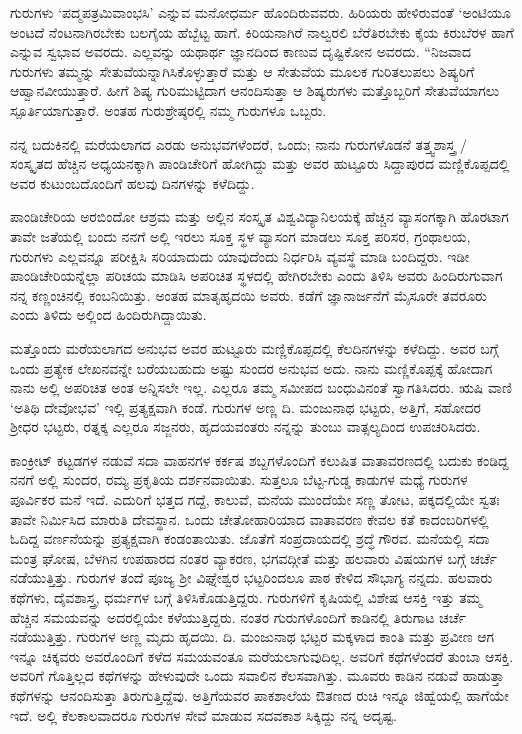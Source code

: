 ಗುರುಗಳು ‘ಪದ್ಮಪತ್ರಮಿವಾಂಭಸಿ’ ಎನ್ನುವ ಮನೋಧರ್ಮ ಹೊಂದಿರುವವರು. ಹಿರಿಯರು ಹೇಳಿರುವಂತೆ ‘ಅಂಟಿಯೂ ಅಂಟದೆ ನೆಂಟನಾಗಿರಬೇಕು ಬಲಗೈಯ ಹೆಬ್ಬೆಟ್ಟ ಹಾಗೆ. ಕಿರಿಯನಾಗಿರೆ ನಾಲ್ವರಲಿ ಬೆರೆತಿರಬೇಕು ಕೈಯ ಕಿರುಬೆರಳ ಹಾಗೆ ಎನ್ನುವ ಸ್ವಭಾವ ಅವರದು. ಎಲ್ಲವನ್ನು ಯಥಾರ್ಥ ಜ್ಞಾನದಿಂದ ಕಾಣುವ ದೃಷ್ಟಿಕೋನ ಅವರದು. “ನಿಜವಾದ ಗುರುಗಳು ತಮ್ಮನ್ನು ಸೇತುವೆಯನ್ನಾಗಿಸಿಕೊಳ್ಳುತ್ತಾರೆ ಮತ್ತು ಆ ಸೇತುವೆಯ ಮೂಲಕ ಗುರಿತಲುಪಲು ಶಿಷ್ಯರಿಗೆ ಆಹ್ವಾನವೀಯುತ್ತಾರೆ. ಹೀಗೆ ಶಿಷ್ಯ ಗುರಿಮುಟ್ಟಿದಾಗ ಆನಂದಿಸುತ್ತಾ ಆ ಶಿಷ್ಯರುಗಳು ಮತ್ತೊಬ್ಬರಿಗೆ ಸೇತುವೆಯಾಗಲು ಸ್ಪೂರ್ತಿಯಾಗುತ್ತಾರೆ. ಅಂತಹ ಗುರುಶ್ರೇಷ್ಠರಲ್ಲಿ ನಮ್ಮ ಗುರುಗಳೂ ಒಬ್ಬರು.

ನನ್ನ ಬದುಕಿನಲ್ಲಿ ಮರೆಯಲಾಗದ ಎರಡು ಅನುಭವಗಳೆಂದರೆ, ಒಂದು; ನಾನು ಗುರುಗಳೊಡನೆ ತತ್ತ್ವಶಾಸ್ತ್ರ / ಸಂಸ್ಕೃತದ ಹೆಚ್ಚಿನ ಅಧ್ಯಯನಕ್ಕಾಗಿ ಪಾಂಡಿಚೇರಿಗೆ ಹೋಗಿದ್ದು ಮತ್ತು ಅವರ ಹುಟ್ಟೂರು ಸಿದ್ದಾಪುರದ ಮಣ್ಣಿಕೊಪ್ಪದಲ್ಲಿ ಅವರ ಕುಟುಂಬದೊಂದಿಗೆ ಹಲವು ದಿನಗಳನ್ನು ಕಳೆದಿದ್ದು.

ಪಾಂಡಿಚೇರಿಯ ಅರಬಿಂದೋ ಆಶ್ರಮ ಮತ್ತು ಅಲ್ಲಿನ ಸಂಸ್ಕೃತ ವಿಶ್ವವಿದ್ಯಾನಿಲಯಕ್ಕೆ ಹೆಚ್ಚಿನ ವ್ಯಾಸಂಗಕ್ಕಾಗಿ ಹೊರಟಾಗ ತಾವೇ ಜತೆಯಲ್ಲಿ ಬಂದು ನನಗೆ ಅಲ್ಲಿ ಇರಲು ಸೂಕ್ತ ಸ್ಥಳ ವ್ಯಾಸಂಗ ಮಾಡಲು ಸೂಕ್ತ ಪರಿಸರ, ಗ್ರಂಥಾಲಯ, ಗುರುಗಳು ಎಲ್ಲವನ್ನೂ ಪರೀಕ್ಷಿಸಿ ಸರಿಯಾದುದು ಯಾವುದೆಂದು ನಿರ್ಧರಿಸಿ ವ್ಯವಸ್ಥೆ ಮಾಡಿ ಬಂದಿದ್ದರು. ಇಡೀ ಪಾಂಡಿಚೇರಿಯನ್ನೆಲ್ಲಾ ಪರಿಚಯ ಮಾಡಿಸಿ ಅಪರಿಚಿತ ಸ್ಥಳದಲ್ಲಿ ಹೇಗಿರಬೇಕು ಎಂದು ತಿಳಿಸಿ ಅವರು ಹಿಂದಿರುಗುವಾಗ ನನ್ನ ಕಣ್ಣಂಚಿನಲ್ಲಿ ಕಂಬನಿಯಿತ್ತು. ಅಂತಹ ಮಾತೃಹೃದಯಿ ಅವರು. ಕಡೆಗೆ ಜ್ಞಾನಾರ್ಜನೆಗೆ ಮೈಸೂರೇ ತವರೂರು ಎಂದು ತಿಳಿದು ಅಲ್ಲಿಂದ ಹಿಂದಿರುಗಿದ್ದಾಯಿತು.

ಮತ್ತೊಂದು ಮರೆಯಲಾಗದ ಅನುಭವ ಅವರ ಹುಟ್ಟೂರು ಮಣ್ಣಿಕೊಪ್ಪದಲ್ಲಿ ಕೆಲದಿನಗಳನ್ನು ಕಳೆದಿದ್ದು. ಅವರ ಬಗ್ಗೆ ಒಂದು ಪ್ರತ್ಯೇಕ ಲೇಖನವನ್ನೇ ಬರೆಯಬಹುದು ಅಷ್ಟು ಸುಂದರ ಅನುಭವ ಅದು. ನಾನು ಮಣ್ಣಿಕೊಪ್ಪಕ್ಕೆ ಹೋದಾಗ ನಾನು ಅಲ್ಲಿ ಅಪರಿಚಿತ ಅಂತ ಅನ್ನಿಸಲೇ ಇಲ್ಲ. ಎಲ್ಲರೂ ತಮ್ಮ ಸಮೀಪದ ಬಂಧುವಿನಂತೆ ಸ್ವಾಗತಿಸಿದರು. ಋಷಿ ವಾಣಿ ‘ಅತಿಥಿ ದೇವೋಭವ’ ಇಲ್ಲಿ ಪ್ರತ್ಯಕ್ಷವಾಗಿ ಕಂಡೆ. ಗುರುಗಳ ಅಣ್ಣ ದಿ. ಮಂಜುನಾಥ ಭಟ್ಟರು, ಅತ್ತಿಗೆ, ಸಹೋದರ ಶ್ರೀಧರ ಭಟ್ಟರು, ರತ್ನಕ್ಕ ಎಲ್ಲರೂ ಸಜ್ಜನರು, ಹೃದಯವಂತರು ನನ್ನನ್ನು ತುಂಬು ವಾತ್ಸಲ್ಯದಿಂದ ಉಪಚರಿಸಿದರು.

ಕಾಂಕ್ರೀಟ್ ಕಟ್ಟಡಗಳ ನಡುವೆ ಸದಾ ವಾಹನಗಳ ಕರ್ಕಷ ಶಬ್ದಗಳೊಂದಿಗೆ ಕಲುಷಿತ ವಾತಾವರಣದಲ್ಲಿ ಬದುಕು ಕಂಡಿದ್ದ ನನಗೆ ಅಲ್ಲಿ ಸುಂದರ, ರಮ್ಯ ಪ್ರಕೃತಿಯ ದರ್ಶನವಾಯಿತು. ಸುತ್ತಲೂ ಬೆಟ್ಟ-ಗುಡ್ಡ ಕಾಡುಗಳ ಮಧ್ಯೆ ಗುರುಗಳ ಪೂರ್ವಿಕರ ಮನೆ ಇದೆ. ಎದುರಿಗೆ ಭತ್ತದ ಗದ್ದೆ, ಕಾಲುವೆ, ಮನೆಯ ಮುಂದೆಯೇ ಸಣ್ಣ ತೋಟ, ಪಕ್ಕದಲ್ಲಿಯೇ ಸ್ವತಃ ತಾವೇ ನಿರ್ಮಿಸಿದ ಮಾರುತಿ ದೇವಸ್ಥಾನ. ಒಂದು ಚೇತೋಹಾರಿಯಾದ ವಾತಾವರಣ ಕೇವಲ ಕತೆ ಕಾದಂಬರಿಗಳಲ್ಲಿ ಓದಿದ್ದ ವರ್ಣನೆಯನ್ನು ಪ್ರತ್ಯಕ್ಷವಾಗಿ ಕಂಡಂತಾಯಿತು. ಜೊತೆಗೆ ಸಂಪ್ರದಾಯದಲ್ಲಿ ಶ್ರದ್ಧೆ ಗೌರವ. ಮನೆಯಲ್ಲಿ ಸದಾ ಮಂತ್ರ ಘೋಷ, ಬೆಳಗಿನ ಉಪಹಾರದ ನಂತರ ವ್ಯಾಕರಣ, ಭಗವದ್ಗೀತೆ ಮತ್ತು ಹಲವಾರು ವಿಷಯಗಳ ಬಗ್ಗೆ ಚರ್ಚೆ ನಡೆಯುತ್ತಿತ್ತು. ಗುರುಗಳ ತಂದೆ ಪೂಜ್ಯ ಶ್ರೀ ವಿಘ್ನೇಶ್ವರ ಭಟ್ಟರಿಂದಲೂ ಪಾಠ ಕೇಳಿದ ಸೌಭಾಗ್ಯ ನನ್ನದು. ಹಲವಾರು ಕಥೆಗಳು, ದೈವಶಾಸ್ತ್ರ, ಧರ್ಮಗಳ ಬಗ್ಗೆ ತಿಳಿಸಿಕೊಡುತ್ತಿದ್ದರು. ಗುರುಗಳಿಗೆ ಕೃಷಿಯಲ್ಲಿ ವಿಶೇಷ ಆಸಕ್ತಿ ಇತ್ತು ತಮ್ಮ ಹೆಚ್ಚಿನ ಸಮಯವನ್ನು ಅದರಲ್ಲಿಯೇ ಕಳೆಯುತ್ತಿದ್ದರು. ನಂತರ ಗುರುಗಳೊಂದಿಗೆ ಕಾಡಿನಲ್ಲಿ ತಿರುಗಾಟ ಚರ್ಚೆ ನಡೆಯುತ್ತಿತ್ತು. ಗುರುಗಳ ಅಣ್ಣ ಮೃದು ಹೃದಯಿ. ದಿ. ಮಂಜುನಾಥ ಭಟ್ಟರ ಮಕ್ಕಳಾದ ಕಾಂತಿ ಮತ್ತು ಪ್ರವೀಣ ಆಗ ಇನ್ನೂ ಚಿಕ್ಕವರು ಅವರೊಂದಿಗೆ ಕಳೆದ ಸಮಯವಂತೂ ಮರೆಯಲಾಗುವುದಿಲ್ಲ. ಅವರಿಗೆ ಕಥೆಗಳೆಂದರೆ ತುಂಬಾ ಆಸಕ್ತಿ. ಅವರಿಗೆ ಗೊತ್ತಿಲ್ಲದ ಕಥೆಗಳನ್ನು ಹೇಳುವುದೇ ಒಂದು ಸವಾಲಿನ ಕೆಲಸವಾಗಿತ್ತು. ಮೂವರು ಕಾಡಿನ ನಡುವೆ ಹಾಡುತ್ತಾ ಕಥೆಗಳನ್ನು ಆನಂದಿಸುತ್ತಾ ತಿರುಗುತ್ತಿದ್ದೆವು. ಅತ್ತಿಗೆಯವರ ಪಾಕಶಾಲೆಯ ಔತಣದ ರುಚಿ ಇನ್ನೂ ಜಿಹ್ವೆಯಲ್ಲಿ ಹಾಗೆಯೇ ಇದೆ. ಅಲ್ಲಿ ಕೆಲಕಾಲವಾದರೂ ಗುರುಗಳ ಸೇವೆ ಮಾಡುವ ಸದವಕಾಶ ಸಿಕ್ಕಿದ್ದು ನನ್ನ ಅದೃಷ್ಟ.

